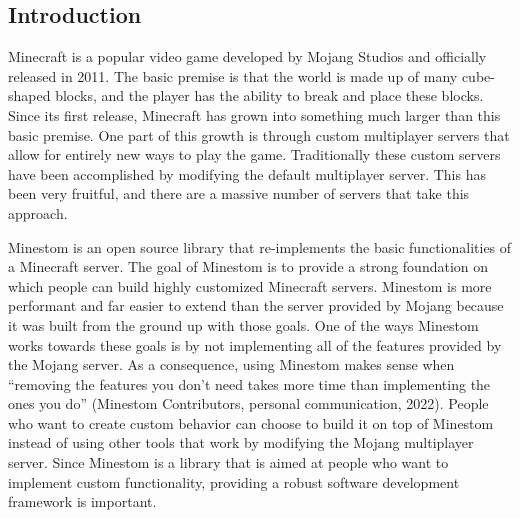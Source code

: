 \documentclass[12pt]{article}
\begin{document}
\newpage %
\begin{onehalfspacing} %

\onehalfspacing
{} %
\setcounter{page}{1} %

\section{Introduction} %

Minecraft is a popular video game developed by Mojang Studios and
officially released in 2011. The basic premise is that the world is made
up of many cube-shaped blocks, and the player has the ability to break
and place these blocks. Since its first release, Minecraft has grown
into something much larger than this basic premise. One part of this
growth is through custom multiplayer servers that allow for entirely new
ways to play the game. Traditionally these custom servers have been
accomplished by modifying the default multiplayer server. This has been
very fruitful, and there are a massive number of servers that take this
approach.

Minestom is an open source library that re-implements the basic
functionalities of a Minecraft server. The goal of Minestom is to
provide a strong foundation on which people can build highly customized
Minecraft servers. Minestom is more performant and far easier to extend
than the server provided by Mojang because it was built from the ground
up with those goals. One of the ways Minestom works towards these goals
is by not implementing all of the features provided by the Mojang
server. As a consequence, using Minestom makes sense when ``removing the
features you don't need takes more time than implementing the ones you
do'' (Minestom Contributors, personal communication, 2022). People who
want to create custom behavior can choose to build it on top of Minestom
instead of using other tools that work by modifying the Mojang
multiplayer server. Since Minestom is a library that is aimed at people
who want to implement custom functionality, providing a robust software
development framework is important.


\end{onehalfspacing}
\end{document}
